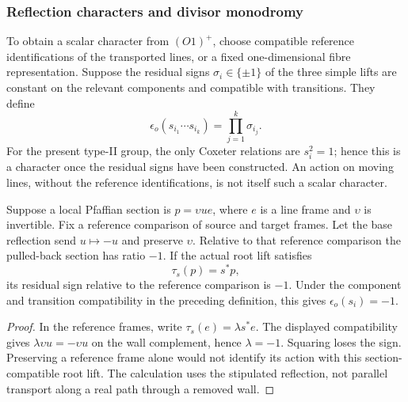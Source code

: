 \subsubsection*{Reflection characters and divisor monodromy}

\begin{definition}
\label{def:orientation-character-epsilon-o}
To obtain a scalar character from \((O1)^+\), choose compatible
reference identifications of the transported lines, or a fixed
one-dimensional fibre representation.  Suppose the residual signs
\(\sigma_i\in\{\pm1\}\) of the three simple lifts are constant on
the relevant components and compatible with transitions.  They
define
\[
 \epsilon_o(s_{i_1}\cdots s_{i_k})=\prod_{j=1}^k\sigma_{i_j}.
\]
For the present type-II group, the only Coxeter relations are
\(s_i^2=1\); hence this is a character once the residual signs have
been constructed.  An action on moving lines, without the reference
identifications, is not itself such a scalar character.
\end{definition}

\begin{proposition}
\label{prop:orientation-character-simple-wall-sign-criterion}
Suppose a local Pfaffian section is \(p=\upsilon u e\), where
\(e\) is a line frame and \(\upsilon\) is invertible.  Fix a reference
comparison of source and target frames.  Let the base reflection
send \(u\mapsto-u\) and preserve \(\upsilon\).  Relative to that
reference comparison the pulled-back section has ratio \(-1\).
If the actual root lift satisfies
\[
 \tau_s(p)=s^*p,
\]
its residual sign relative to the reference comparison is \(-1\).
Under the component and transition compatibility in the preceding
definition, this gives \(\epsilon_o(s_i)=-1\).
\end{proposition}
\begin{proof}
In the reference frames, write \(\tau_s(e)=\lambda s^*e\).
The displayed compatibility gives
\(\lambda\upsilon u=-\upsilon u\) on the wall complement, hence
\(\lambda=-1\).  Squaring loses the sign.  Preserving a reference
frame alone would not identify its action with this section-compatible
root lift.  The calculation uses the stipulated reflection, not
parallel transport along a real path through a removed wall.
\end{proof}

